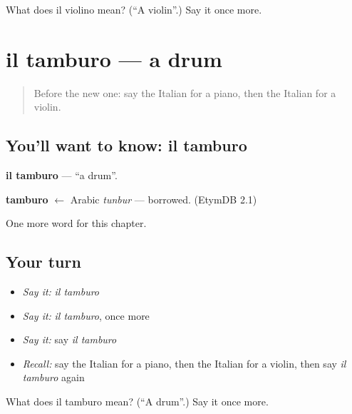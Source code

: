 \begin{tcolorbox}[breakable,colback=teal!4,colframe=teal!35!black,title={Before you move on}]
What does il violino mean? (\textquotedblleft{}A violin\textquotedblright{}.) Say it once more.
\end{tcolorbox}
\section[il tamburo]{il tamburo — a drum}

\label{lesson:IT-C170-tamburo}



\begin{quote}
Before the new one: say the Italian for a piano, then the Italian for a violin.
\end{quote}

\subsection*{You'll want to know: il tamburo}
\textbf{il tamburo} — \textquotedblleft{}a drum\textquotedblright{}.

\begin{cousinweb}
\textbf{tamburo} $\leftarrow$ Arabic \emph{tunbur} — borrowed. (EtymDB 2.1)
\end{cousinweb}

\begin{grammarlens}[title={What you've built}]
One more word for this chapter.
\end{grammarlens}

\subsection*{Your turn}
\begin{itemize}
\raggedright
  \item \emph{Say it:} \emph{il tamburo}
  \item \emph{Say it:} \emph{il tamburo}, once more
  \item \emph{Say it:} say \emph{il tamburo}
  \item \emph{Recall:} say the Italian for a piano, then the Italian for a violin, then say \emph{il tamburo} again
\end{itemize}

\begin{tcolorbox}[breakable,colback=teal!4,colframe=teal!35!black,title={Before you move on}]
What does il tamburo mean? (\textquotedblleft{}A drum\textquotedblright{}.) Say it once more.
\end{tcolorbox}
